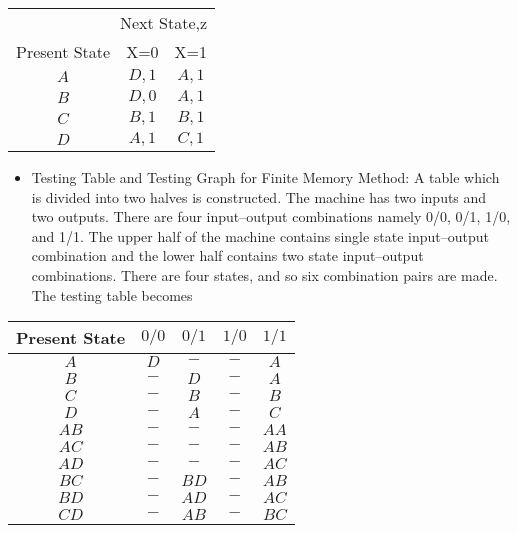 \documentclass[10pt]{article}
\begin{document}
\begin{center}
\begin{tabular}{ccc}
\hline

\hline

\hline

\hline
  \multicolumn{3}{r}{{Next State,z}}\\
 \cline{2-3}
{Present State} & {X=0} & {X=1}\\
\hline
$A$ & $D, 1$ & $A, 1$ \\
$B$ & $D, 0$ & $A, 1$ \\
$C$ & $B, 1$ & $B, 1$ \\
$D$ & $A, 1$ & $C, 1$ \\
\hline

\hline

\hline

\hline
\end{tabular}
\end{center}

\vspace*{0.2cm}

\begin{itemize}
  \item Testing Table and Testing Graph for Finite Memory Method: A table which is divided into two
halves is constructed. The machine has two inputs and two outputs. There are four input–output
combinations namely 0/0, 0/1, 1/0, and 1/1. The upper half of the machine contains single state
input–output combination and the lower half contains two state input–output combinations. There
are four states, and so six combination pairs are made. The testing table becomes\\
\end{itemize}

\begin{center}
\begin{tabular}{ccccc}
\hline

\hline

\hline

\hline

Present State & $0/0$ & $0/1$ & $1/0$ & $1/1$ \\
\hline
$A$  & $D$ & $-$  & $-$ & $A$\\
$B$  & $-$ & $D$  & $-$ & $A$\\
$C$  & $-$ & $B$  & $-$ & $B$\\
$D$  & $-$ & $A$  & $-$ & $C$\\
$AB$ & $-$ & $-$  & $-$ & $AA$\\
$AC$ & $-$ & $-$  & $-$ & $AB$\\
$AD$ & $-$ & $-$  & $-$ & $AC$\\
$BC$ & $-$ & $BD$ & $-$ & $AB$\\
$BD$ & $-$ & $AD$ & $-$ & $AC$\\
$CD$ & $-$ & $AB$ & $-$ & $BC$\\
\hline

\hline

\hline

\hline
\end{tabular}
\end{center}
\end{document}
